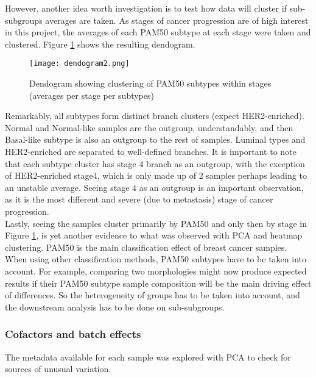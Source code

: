     \newpage
    However, another idea worth investigation is to test how data will cluster if sub-subgroups averages are taken. As stages of cancer progression are of high interest in this project, the averages of each PAM50 subtype at each stage were taken and clustered. Figure \ref{fig:dendogram} shows the resulting dendogram. 
    
            \begin{figure}[!h]
            \centering
            \texttt{[image: dendogram2.png]}
            \caption{Dendogram showing clustering of PAM50 subtypes within stages (averages per stage per subtypes)}
            \label{fig:dendogram}
            \end{figure}
    
    Remarkably, all subtypes form distinct branch clusters (expect HER2-enriched). Normal and Normal-like samples are the outgroup, understandably, and then Basal-like subtype is also an outgroup to the rest of samples. Luminal types and HER2-enriched are separated to well-defined branches. It is important to note that each subtype cluster has stage 4 branch as an outgroup, with the exception of HER2-enriched stage4, which is only made up of 2 samples perhaps leading to an unstable average. Seeing stage 4 as an outgroup is an important observation, as it is the most different and severe (due to metastasis) stage of cancer progression. \\
    
    Lastly, seeing the samples cluster primarily by PAM50 and only then by stage in Figure \ref{fig:dendogram}, is yet another evidence to what was observed with PCA and heatmap clustering. PAM50 is the main classification effect of breast cancer samples. When using other classification methods, PAM50 subtypes have to be taken into account. For example, comparing two morphologies might now produce expected results if their PAM50 subtype sample composition will be the main driving effect of differences. So the heterogeneity of groups has to be taken into account, and the downstream analysis has to be done on sub-subgroups.  
    
 
   

    

    
 
    
    \newpage
     \subsubsection{Cofactors and batch effects}
    The metadata available for each sample was explored with PCA to check for sources of unusual variation.
    
